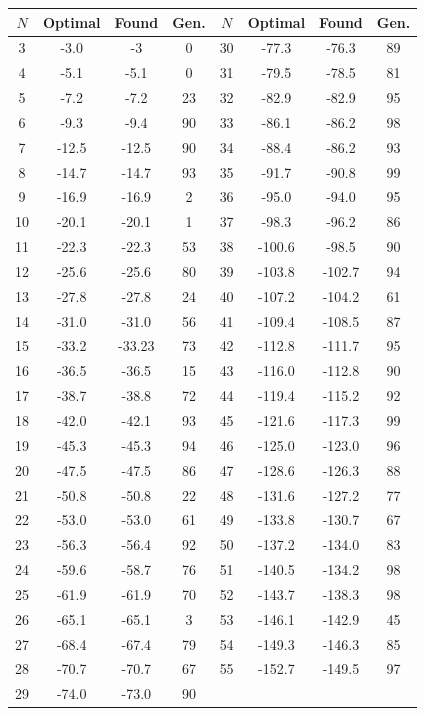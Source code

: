 \documentclass{article}
\begin{document}
 \begin{table}[]
	\label {tab:yessa}
	\centering
	\begin{tabular}{cccc|cccc}
	$N$  & Optimal & Found & Gen. & $N$  & Optimal & Found  & Gen. \\
	\hline
	3  & -3.0    & -3     &    0   & 30 & -77.3   & -76.3    &  89  \\
	4  & -5.1    & -5.1   &    0   & 31 & -79.5   & -78.5    &  81  \\
	5  & -7.2    & -7.2   &    23  & 32 & -82.9   & -82.9    &  95  \\
	6  & -9.3    & -9.4   &    90  & 33 & -86.1   & -86.2    &  98  \\
	7  & -12.5   & -12.5  &    90  & 34 & -88.4   & -86.2    &  93  \\
	8  & -14.7   & -14.7  &    93  & 35 & -91.7   & -90.8    &  99  \\
	9  & -16.9   & -16.9  &    2   & 36 & -95.0   & -94.0    &  95  \\
	10 & -20.1   & -20.1  &    1   & 37 & -98.3   & -96.2    &  86  \\
	11 & -22.3   & -22.3  &    53  & 38 & -100.6  & -98.5    &  90  \\
	12 & -25.6   & -25.6  &    80  & 39 & -103.8  & -102.7   &  94  \\
	13 & -27.8   & -27.8  &    24  & 40 & -107.2  & -104.2   &  61  \\
	14 & -31.0   & -31.0  &    56  & 41 & -109.4  & -108.5   &  87  \\
	15 & -33.2   & -33.23 &    73  & 42 & -112.8  & -111.7   &  95  \\
	16 & -36.5   & -36.5  &    15  & 43 & -116.0  & -112.8   &  90  \\
	17 & -38.7   & -38.8  &    72  & 44 & -119.4  & -115.2   &  92  \\
	18 & -42.0   & -42.1  &    93  & 45 & -121.6  & -117.3   &  99  \\
	19 & -45.3   & -45.3  &    94  & 46 & -125.0  & -123.0   &  96  \\
	20 & -47.5   & -47.5  &    86  & 47 & -128.6  & -126.3   &  88  \\
	21 & -50.8   & -50.8  &    22  & 48 & -131.6  & -127.2   &  77  \\
	22 & -53.0   & -53.0  &    61  & 49 & -133.8  & -130.7   &  67  \\
	23 & -56.3   & -56.4  &    92  & 50 & -137.2  & -134.0   &  83  \\
	24 & -59.6   & -58.7  &    76  & 51 & -140.5  & -134.2   &  98  \\
	25 & -61.9   & -61.9  &    70  & 52 & -143.7  & -138.3   &  98  \\
	26 & -65.1   & -65.1  &    3   & 53 & -146.1  & -142.9   &  45  \\
	27 & -68.4   & -67.4  &    79  & 54 & -149.3  & -146.3   &  85  \\
	28 & -70.7   & -70.7  &    67  & 55 & -152.7  & -149.5   &  97  \\
	29 & -74.0   & -73.0  &    90  &    &         &          &       \\


\end{tabular}
\end{table}
\end{document}
